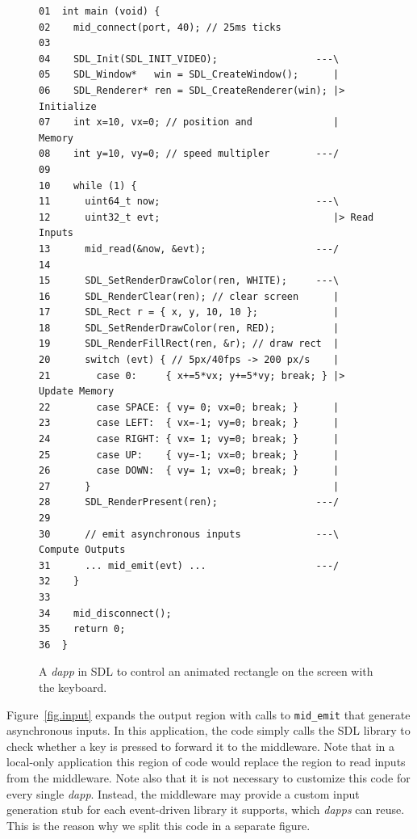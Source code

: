 \documentclass[sigplan,screen]{acmart}
\newcommand{\dapp}{\emph{dapp}\xspace}
\newcommand{\dapps}{\emph{dapps}\xspace}
\begin{document}
\begin{figure}[t]
{\scriptsize
\begin{verbatim}
01  int main (void) {
02    mid_connect(port, 40); // 25ms ticks
03
04    SDL_Init(SDL_INIT_VIDEO);                 ---\
05    SDL_Window*   win = SDL_CreateWindow();      |
06    SDL_Renderer* ren = SDL_CreateRenderer(win); |> Initialize
07    int x=10, vx=0; // position and              |    Memory
08    int y=10, vy=0; // speed multipler        ---/
09
10    while (1) {
11      uint64_t now;                           ---\
12      uint32_t evt;                              |> Read Inputs
13      mid_read(&now, &evt);                   ---/
14
15      SDL_SetRenderDrawColor(ren, WHITE);     ---\
16      SDL_RenderClear(ren); // clear screen      |
17      SDL_Rect r = { x, y, 10, 10 };             |
18      SDL_SetRenderDrawColor(ren, RED);          |
19      SDL_RenderFillRect(ren, &r); // draw rect  |
20      switch (evt) { // 5px/40fps -> 200 px/s    |
21        case 0:     { x+=5*vx; y+=5*vy; break; } |> Update Memory
22        case SPACE: { vy= 0; vx=0; break; }      |
23        case LEFT:  { vx=-1; vy=0; break; }      |
24        case RIGHT: { vx= 1; vy=0; break; }      |
25        case UP:    { vy=-1; vx=0; break; }      |
26        case DOWN:  { vy= 1; vx=0; break; }      |
27      }                                          |
28      SDL_RenderPresent(ren);                 ---/
29
30      // emit asynchronous inputs             ---\  Compute Outputs
31      ... mid_emit(evt) ...                   ---/
32    }
33
34    mid_disconnect();
35    return 0;
36  }
\end{verbatim}
}
  \caption{
    \label{fig.sdl}
    A \dapp in SDL to control an animated rectangle on the screen with the keyboard.
  }
\end{figure}

Figure~\ref{fig.input} expands the output region with calls to
\texttt{mid\_emit} that generate asynchronous inputs.
In this application, the code simply calls the SDL library to check whether a
key is pressed to forward it to the middleware. %
Note that in a local-only application this region of code would replace the
region to read inputs from the middleware.
Note also that it is not necessary to customize this code for every single
\dapp.
Instead, the middleware may provide a custom input generation stub for each
event-driven library it supports, which \dapps can reuse.
This is the reason why we split this code in a separate figure.
\end{document}
